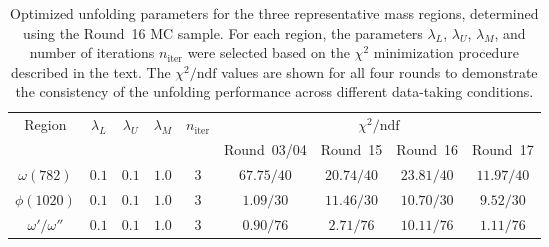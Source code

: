 \begin{table}[t]
    \begin{center}
        \caption{Optimized unfolding parameters for the three representative mass regions, determined using the Round~16 MC sample. For each region, the parameters $\lambda_L$, $\lambda_U$, $\lambda_M$, and number of iterations $n_{\text{iter}}$ were selected based on the $\chi^2$ minimization procedure described in the text. The $\chi^2/\text{ndf}$ values are shown for all four rounds to demonstrate the consistency of the unfolding performance across different data-taking conditions.}
        \vspace{4mm}
        \renewcommand{\arraystretch}{1.3}
        \begin{tabular}{c | c | c | c | c | c | c | c | c}
            \hline \hline
            \multirow{2}{*}{Region} & \multirow{2}{*}{$\lambda_L$} & \multirow{2}{*}{$\lambda_U$} & \multirow{2}{*}{$\lambda_M$} & \multirow{2}{*}{$n_{\text{iter}}$} & \multicolumn{4}{c}{$\chi^2/\text{ndf}$}                                        \\
            \cline{6-9}
                                    &                              &                              &                              &                                    & Round~03/04                             & Round~15   & Round~16   & Round~17   \\
            \hline
            $\omega(782)$           & $0.1$                        & $0.1$                        & $1.0$                        & $3$                                & $67.75/40$                              & $20.74/40$ & $23.81/40$ & $11.97/40$ \\[2pt]
            \hline
            $\phi(1020)$            & $0.1$                        & $0.1$                        & $1.0$                        & $3$                                & $1.09/30$                               & $11.46/30$ & $10.70/30$ & $9.52/30$  \\[2pt]
            \hline
            $\omega'/\omega''$      & $0.1$                        & $0.1$                        & $1.0$                        & $3$                                & $0.90/76$                               & $2.71/76$  & $10.11/76$ & $1.11/76$  \\[2pt]
            \hline \hline
        \end{tabular}
        \label{tab:optimized_parameters}
    \end{center}
\end{table}

